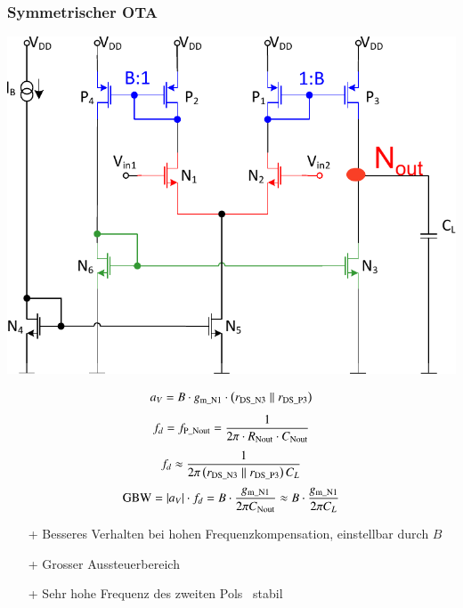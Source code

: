 \subsubsection{Symmetrischer OTA}
\begin{minipage}[t]{0.48\columnwidth}
    \includegraphics[width=\columnwidth, align=t]{images/11_OTA_einstufig_symmetrisch.pdf}
\end{minipage}
\hfill
\begin{minipage}[t]{0.48\columnwidth}
    \[
        a_V = B \cdot  g_{\rm m\_N1} \cdot \left( r_{\rm DS\_N3} \parallel r_{\rm DS\_P3} \right)
    \]
    \[
        f_d = f_{\rm P\_Nout} = \frac{1}{2 \pi \cdot R_{\rm Nout} \cdot C_{\rm Nout}}
    \]
    \[
        f_d \approx \frac{1}{2 \pi \left( r_{\rm DS\_N3} \parallel r_{\rm DS\_P3} \right) C_L}
    \]
    \[
        \text{GBW} = \left|a_V\right| \cdot f_d = B \cdot \frac{g_{\rm m\_N1}}{2 \pi C_{\rm Nout}} \approx B \cdot \frac{g_{\rm m\_N1}}{2 \pi C_L}
    \]
\end{minipage}

\smallskip

\begin{itemize}
    \item[+] Besseres Verhalten bei hohen Frequenzkompensation, einstellbar durch $B$
    \item[+] Grosser Aussteuerbereich
    \item[+] Sehr hohe Frequenz des zweiten Pols \textrightarrow\ stabil
\end{itemize}


